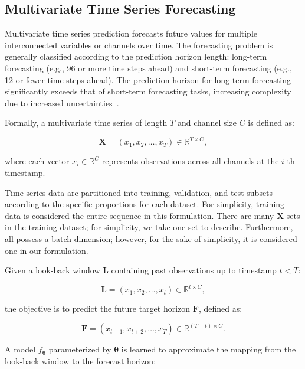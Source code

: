 \subsection*{Multivariate Time Series Forecasting}


Multivariate time series prediction forecasts future values for multiple interconnected variables or channels over time. The forecasting problem is generally classified according to the prediction horizon length: long-term forecasting (e.g., 96 or more time steps ahead) and short-term forecasting (e.g., 12 or fewer time steps ahead). The prediction horizon for long-term forecasting significantly exceeds that of short-term forecasting tasks, increasing complexity due to increased uncertainties~\cite{liu2024itransformerinvertedtransformerseffective, zhao2024dominantshufflesimplepowerful}.

Formally, a multivariate time series of length $T$ and channel size $C$ is defined as:

\begin{equation}
\mathbf{X} = (x_1, x_2, \dots, x_T) \in \mathbb{R}^{T \times C},
\end{equation}

where each vector $x_i \in \mathbb{R}^{C}$ represents observations across all channels at the $i$-th timestamp.

Time series data are partitioned into training, validation, and test subsets according to the specific proportions for each dataset.
For simplicity, training data is considered the entire sequence in this formulation. There are many $\mathbf{X} $ sets in the training dataset; for simplicity, we take one set to describe. Furthermore, all possess a batch dimension; however, for the sake of simplicity, it is considered one in our formulation.


Given a look-back window $\mathbf{L}$ containing past observations up to timestamp $t < T$:

\begin{equation}
\mathbf{L} = (x_1, x_2, \dots, x_t) \in \mathbb{R}^{t \times C},
\end{equation}

the objective is to predict the future target horizon $\mathbf{F}$, defined as:

\begin{equation}
\mathbf{F} = (x_{t+1}, x_{t+2}, \dots, x_{T}) \in \mathbb{R}^{(T - t) \times C}.
\end{equation}

A model $f_{\boldsymbol{\theta}}$ parameterized by $\boldsymbol{\theta}$ is learned to approximate the mapping from the look-back window to the forecast horizon:

